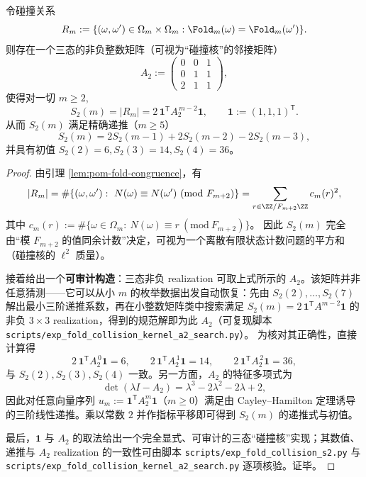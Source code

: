 \begin{proposition}[碰撞核的三态表示与三阶递推]\label{prop:pom-s2-recurrence}
令碰撞关系
$$
R_m:=\{(\omega,\omega')\in\Omega_m\times\Omega_m:\Fold_m(\omega)=\Fold_m(\omega')\}.
$$
则存在一个三态的非负整数矩阵（可视为“碰撞核”的邻接矩阵）
$$
A_2:=
\begin{pmatrix}
0&0&1\\
0&1&1\\
2&1&1
\end{pmatrix},
$$
使得对一切 \(m\ge 2\),
$$
S_2(m)=|R_m|
=2\,\mathbf{1}^{\mathsf T}A_2^{\,m-2}\mathbf{1},
\qquad \mathbf{1}:=(1,1,1)^{\mathsf T}.
$$
从而 \(S_2(m)\) 满足精确递推（\(m\ge 5\)）
$$
S_2(m)=2S_2(m-1)+2S_2(m-2)-2S_2(m-3),
$$
并具有初值 \(S_2(2)=6,S_2(3)=14,S_2(4)=36\)。
\end{proposition}
\begin{proof}
由引理 \ref{lem:pom-fold-congruence}，有
$$
|R_m|
=\#\{(\omega,\omega'):\ N(\omega)\equiv N(\omega')\ (\mathrm{mod}\ F_{m+2})\}
=\sum_{r\in\ZZ/F_{m+2}\ZZ} c_m(r)^2,
$$
其中 \(c_m(r):=\#\{\omega\in\Omega_m:\ N(\omega)\equiv r\ (\mathrm{mod}\ F_{m+2})\}\)。
因此 \(S_2(m)\) 完全由“模 \(F_{m+2}\) 的值同余计数”决定，可视为一个离散有限状态计数问题的平方和（碰撞核的 \(\ell^2\) 质量）。

接着给出一个\textbf{可审计构造}：三态非负 realization 可取上式所示的 \(A_2\)。该矩阵并非任意猜测——它可以从小 \(m\) 的枚举数据出发自动恢复：先由 \(S_2(2),\dots,S_2(7)\) 解出最小三阶递推系数，再在小整数矩阵类中搜索满足
\(
S_2(m)=2\,\mathbf{1}^{\mathsf T}A^{m-2}\mathbf{1}
\)
的非负 \(3\times 3\) realization，得到的规范解即为此 \(A_2\)（可复现脚本 \texttt{scripts/exp\_fold\_collision\_kernel\_a2\_search.py}）。
为核对其正确性，直接计算得
$$
2\,\mathbf{1}^{\mathsf T}A_2^{\,0}\mathbf{1}=6,\qquad
2\,\mathbf{1}^{\mathsf T}A_2^{\,1}\mathbf{1}=14,\qquad
2\,\mathbf{1}^{\mathsf T}A_2^{\,2}\mathbf{1}=36,
$$
与 \(S_2(2),S_2(3),S_2(4)\) 一致。另一方面，\(A_2\) 的特征多项式为
$$
\det(\lambda I-A_2)=\lambda^3-2\lambda^2-2\lambda+2,
$$
因此对任意向量序列 \(u_m:=\mathbf{1}^{\mathsf T}A_2^{m}\mathbf{1}\)（\(m\ge 0\)）满足由 Cayley--Hamilton 定理诱导的三阶线性递推。乘以常数 \(2\) 并作指标平移即可得到 \(S_2(m)\) 的递推式与初值。

最后，\(\mathbf{1}\) 与 \(A_2\) 的取法给出一个完全显式、可审计的三态“碰撞核”实现；其数值、递推与 \(A_2\) realization 的一致性可由脚本 \texttt{scripts/exp\_fold\_collision\_s2.py} 与 \texttt{scripts/exp\_fold\_collision\_kernel\_a2\_search.py} 逐项核验。证毕。
\end{proof}

